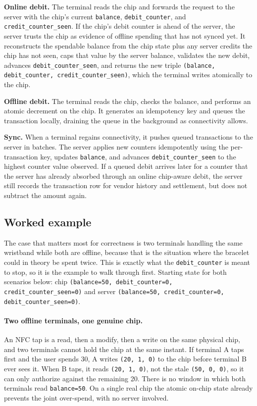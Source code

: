 \textbf{Online debit.} The terminal reads the chip and forwards the request to the server with the chip's current \texttt{balance}, \texttt{debit\_counter}, and \texttt{credit\_counter\_seen}. If the chip's debit counter is ahead of the server, the server trusts the chip as evidence of offline spending that has not synced yet. It reconstructs the spendable balance from the chip state plus any server credits the chip has not seen, caps that value by the server balance, validates the new debit, advances \texttt{debit\_counter\_seen}, and returns the new triple \texttt{(balance, debit\_counter, credit\_counter\_seen)}, which the terminal writes atomically to the chip.

\textbf{Offline debit.} The terminal reads the chip, checks the balance, and performs an atomic decrement on the chip. It generates an idempotency key and queues the transaction locally, draining the queue in the background as connectivity allows.

\textbf{Sync.} When a terminal regains connectivity, it pushes queued transactions to the server in batches. The server applies new counters idempotently using the per-transaction key, updates \texttt{balance}, and advances \texttt{debit\_counter\_seen} to the highest counter value observed. If a queued debit arrives later for a counter that the server has already absorbed through an online chip-aware debit, the server still records the transaction row for vendor history and settlement, but does not subtract the amount again.

\subsection{Worked example}
\label{subsec:reconciliation-example}

The case that matters most for correctness is two terminals handling the same wristband while both are offline, because that is the situation where the bracelet could in theory be spent twice. This is exactly what the \texttt{debit\_counter} is meant to stop, so it is the example to walk through first. Starting state for both scenarios below: chip \texttt{(balance=50, debit\_counter=0, credit\_counter\_seen=0)} and server \texttt{(balance=50, credit\_counter=0, debit\_counter\_seen=0)}.

\paragraph{Two offline terminals, one genuine chip.} An NFC tap is a read, then a modify, then a write on the same physical chip, and two terminals cannot hold the chip at the same instant. If terminal A taps first and the user spends 30, A writes \texttt{(20, 1, 0)} to the chip before terminal B ever sees it. When B taps, it reads \texttt{(20, 1, 0)}, not the stale \texttt{(50, 0, 0)}, so it can only authorize against the remaining 20. There is no window in which both terminals read \texttt{balance=50}. On a single real chip the atomic on-chip state already prevents the joint over-spend, with no server involved.



